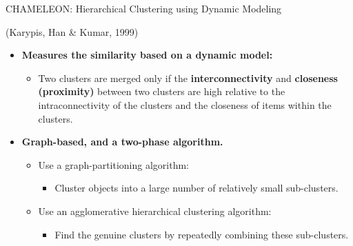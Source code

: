 \begin{frame}{CHAMELEON: Hierarchical Clustering using Dynamic Modeling}

  (Karypis, Han \& Kumar, 1999)
  \begin{itemize}
  \item \textbf{Measures the similarity based on a dynamic model:}
    \begin{itemize}
    \item Two clusters are merged only if the
      \textbf{interconnectivity} and \textbf{closeness (proximity)}
      between two clusters are high relative to the intraconnectivity
      of the clusters and the closeness of items within the clusters.
    \end{itemize}
  \item \textbf{Graph-based, and a two-phase algorithm.}
    \begin{itemize}
    \item Use a graph-partitioning algorithm:
      \begin{itemize}
      \item Cluster objects into a large number of relatively
        small sub-clusters.
      \end{itemize}
    \item Use an agglomerative hierarchical clustering algorithm:
      \begin{itemize}
      \item Find the genuine clusters by repeatedly combining
        these sub-clusters.
      \end{itemize}
    \end{itemize}
  \end{itemize}

\end{frame}

